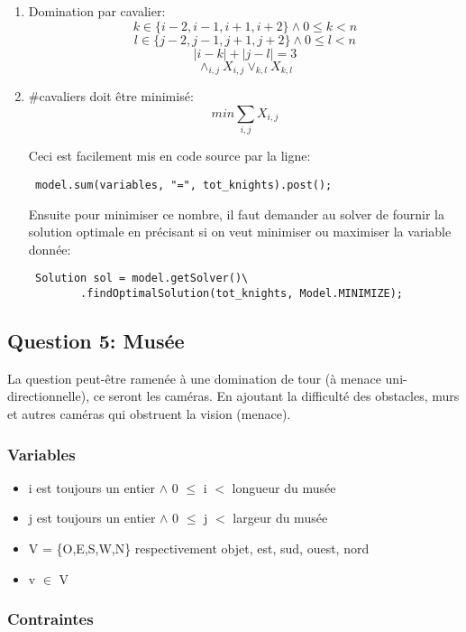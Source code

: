 \begin{enumerate}
    \item Domination par cavalier:
    \[  k \in \{i-2, i-1, i+1, i+2\} \land 0 \leq k < n \]
    \[  l \in \{j-2, j-1, j+1, j+2\} \land 0 \leq l < n \]
    \[  |i-k| + |j-l| = 3 \]
    \[  \land_{i,j} X_{i,j} \lor_{k,l} X_{k,l} \]
    
    \item \#cavaliers doit être minimisé:
    \[  min \sum_{i,j} X_{i,j} \]
    
    Ceci est facilement mis en code source par la ligne:
    \begin{verbatim} model.sum(variables, "=", tot_knights).post(); \end{verbatim}
    
    Ensuite pour minimiser ce nombre, il faut demander au solver de fournir la solution optimale en précisant si on veut minimiser ou maximiser la variable donnée:
    \begin{verbatim} Solution sol = model.getSolver()\
        .findOptimalSolution(tot_knights, Model.MINIMIZE); \end{verbatim}
\end{enumerate}

\newpage

\subsection{Question 5: Musée}
La question peut-être ramenée à une domination de tour (à menace uni-directionnelle), ce seront les caméras. En ajoutant la difficulté des obstacles, murs et autres caméras qui obstruent la vision (menace).\\

\subsubsection{Variables}

\begin{itemize}
    \item i est toujours un entier $\land$ 0 $\leq$ i $<$ longueur du musée
    \item j est toujours un entier $\land$ 0 $\leq$ j $<$ largeur du musée
    \item V = \{O,E,S,W,N\} respectivement objet, est, sud, ouest, nord
    \item v $\in$ V
\end{itemize}


\subsubsection{Contraintes}

